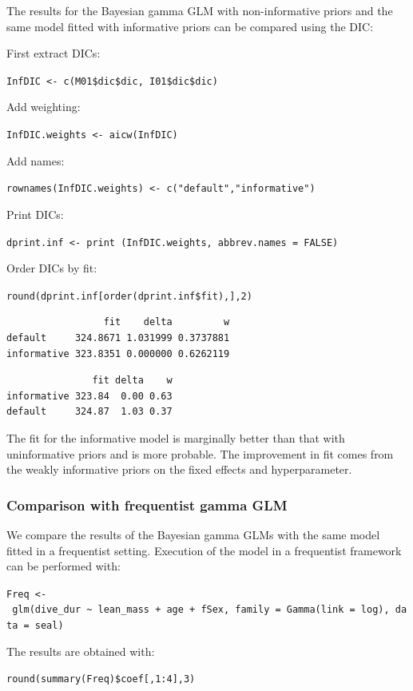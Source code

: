 \documentclass[
]{book}
\begin{document}
The results for the Bayesian gamma GLM with non-informative priors and the same model fitted with informative priors can be compared using the DIC:

First extract DICs:

\texttt{InfDIC\ \textless{}-\ c(M01\$dic\$dic,\ I01\$dic\$dic)}

Add weighting:

\texttt{InfDIC.weights\ \textless{}-\ aicw(InfDIC)}

Add names:

\texttt{rownames(InfDIC.weights)\ \textless{}-\ c("default","informative")}

Print DICs:

\texttt{dprint.inf\ \textless{}-\ print\ (InfDIC.weights,\ abbrev.names\ =\ FALSE)}

Order DICs by fit:

\texttt{round(dprint.inf{[}order(dprint.inf\$fit),{]},2)}

\begin{verbatim}
                 fit    delta         w
default     324.8671 1.031999 0.3737881
informative 323.8351 0.000000 0.6262119
\end{verbatim}

\begin{verbatim}
               fit delta    w
informative 323.84  0.00 0.63
default     324.87  1.03 0.37
\end{verbatim}

The fit for the informative model is marginally better than that with uninformative priors and is more probable. The improvement in fit comes from the weakly informative priors on the fixed effects and hyperparameter.

\hypertarget{gamma-freq-comp}{%
\subsubsection{Comparison with frequentist gamma GLM}\label{gamma-freq-comp}}

We compare the results of the Bayesian gamma GLMs with the same model fitted in a frequentist setting. Execution of the model in a frequentist framework can be performed with:

\texttt{Freq\ \textless{}-\ glm(dive\_dur\ \textasciitilde{}\ lean\_mass\ +\ age\ +\ fSex,\ family\ =\ Gamma(link\ =\ log),\ data\ =\ seal)}

The results are obtained with:

\texttt{round(summary(Freq)\$coef{[},1:4{]},3)}
\end{document}
